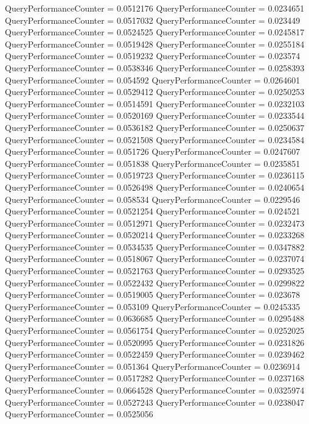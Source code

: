 \documentclass[9pt]{article}
\theoremstyle{plain}
\theoremstyle{definition}
\theoremstyle{remark}
\numberwithin{equation}{section}
\begin{document}
QueryPerformanceCounter  =  0.0512176
QueryPerformanceCounter  =  0.0234651
QueryPerformanceCounter  =  0.0517032
QueryPerformanceCounter  =  0.023449
QueryPerformanceCounter  =  0.0524525
QueryPerformanceCounter  =  0.0245817
QueryPerformanceCounter  =  0.0519428
QueryPerformanceCounter  =  0.0255184
QueryPerformanceCounter  =  0.0519232
QueryPerformanceCounter  =  0.023574
QueryPerformanceCounter  =  0.0538346
QueryPerformanceCounter  =  0.0258393
QueryPerformanceCounter  =  0.054592
QueryPerformanceCounter  =  0.0264601
QueryPerformanceCounter  =  0.0529412
QueryPerformanceCounter  =  0.0250253
QueryPerformanceCounter  =  0.0514591
QueryPerformanceCounter  =  0.0232103
QueryPerformanceCounter  =  0.0520169
QueryPerformanceCounter  =  0.0233544
QueryPerformanceCounter  =  0.0536182
QueryPerformanceCounter  =  0.0250637
QueryPerformanceCounter  =  0.0521508
QueryPerformanceCounter  =  0.0234584
QueryPerformanceCounter  =  0.051726
QueryPerformanceCounter  =  0.0247607
QueryPerformanceCounter  =  0.051838
QueryPerformanceCounter  =  0.0235851
QueryPerformanceCounter  =  0.0519723
QueryPerformanceCounter  =  0.0236115
QueryPerformanceCounter  =  0.0526498
QueryPerformanceCounter  =  0.0240654
QueryPerformanceCounter  =  0.058534
QueryPerformanceCounter  =  0.0229546
QueryPerformanceCounter  =  0.0521254
QueryPerformanceCounter  =  0.024521
QueryPerformanceCounter  =  0.0512971
QueryPerformanceCounter  =  0.0232473
QueryPerformanceCounter  =  0.0520214
QueryPerformanceCounter  =  0.0233268
QueryPerformanceCounter  =  0.0534535
QueryPerformanceCounter  =  0.0347882
QueryPerformanceCounter  =  0.0518067
QueryPerformanceCounter  =  0.0237074
QueryPerformanceCounter  =  0.0521763
QueryPerformanceCounter  =  0.0293525
QueryPerformanceCounter  =  0.0522432
QueryPerformanceCounter  =  0.0299822
QueryPerformanceCounter  =  0.0519005
QueryPerformanceCounter  =  0.023678
QueryPerformanceCounter  =  0.053109
QueryPerformanceCounter  =  0.0245335
QueryPerformanceCounter  =  0.0636685
QueryPerformanceCounter  =  0.0295488
QueryPerformanceCounter  =  0.0561754
QueryPerformanceCounter  =  0.0252025
QueryPerformanceCounter  =  0.0520995
QueryPerformanceCounter  =  0.0231826
QueryPerformanceCounter  =  0.0522459
QueryPerformanceCounter  =  0.0239462
QueryPerformanceCounter  =  0.051364
QueryPerformanceCounter  =  0.0236914
QueryPerformanceCounter  =  0.0517282
QueryPerformanceCounter  =  0.0237168
QueryPerformanceCounter  =  0.0664528
QueryPerformanceCounter  =  0.0325974
QueryPerformanceCounter  =  0.0527243
QueryPerformanceCounter  =  0.0238047
QueryPerformanceCounter  =  0.0525056
\end{document}
